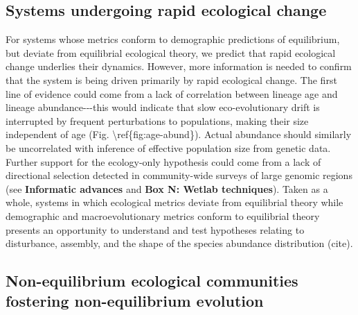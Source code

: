 \documentclass[]{article}
\begin{document}
\subsection{Systems undergoing rapid ecological
change}\label{systems-undergoing-rapid-ecological-change}

For systems whose metrics conform to demographic predictions of
equilibrium, but deviate from equilibrial ecological theory, we predict
that rapid ecological change underlies their dynamics. However, more
information is needed to confirm that the system is being driven
primarily by rapid ecological change. The first line of evidence could
come from a lack of correlation between lineage age and lineage
abundance-\/-\/-this would indicate that slow eco-evolutionary drift is
interrupted by frequent perturbations to populations, making their size
independent of age (Fig. \textbackslash{}ref\{fig:age-abund\}). Actual
abundance should similarly be uncorrelated with inference of effective
population size from genetic data. Further support for the ecology-only
hypothesis could come from a lack of directional selection detected in
community-wide surveys of large genomic regions (see \textbf{Informatic
advances} and \textbf{Box N: Wetlab techniques}). Taken as a whole,
systems in which ecological metrics deviate from equilibrial theory
while demographic and macroevolutionary metrics conform to equilibrial
theory presents an opportunity to understand and test hypotheses
relating to disturbance, assembly, and the shape of the species
abundance distribution (cite).

\subsection{Non-equilibrium ecological communities fostering
non-equilibrium
evolution}\label{non-equilibrium-ecological-communities-fostering-non-equilibrium-evolution}
\end{document}
